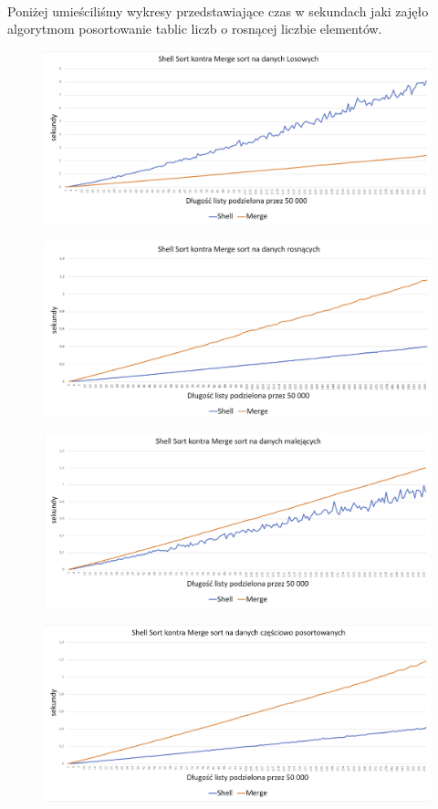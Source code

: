 \documentclass{article}
\begin{document}
\paragraph{} Poniżej umieściliśmy wykresy przedstawiające czas w sekundach jaki zajęło algorytmom posortowanie tablic liczb o rosnącej liczbie elementów.

\begin{figure}[H]
\caption{}
\includegraphics[scale = 0.23]{rand_f.png}\\
\caption{}
\includegraphics[scale = 0.23]{rise_f.png}\\
\end{figure}
\begin{figure}[H]
\caption{}
\includegraphics[scale = 0.23]{descend_f.png}\\
\caption{}
\includegraphics[scale = 0.23]{part-sort_f.png}\\
\end{figure}
\end{document}
